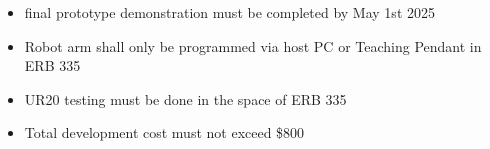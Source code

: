 \begin{itemize}
    \item final prototype demonstration must be completed by May 1st 2025
    \item Robot arm shall only be programmed via host PC or Teaching Pendant in ERB 335
    \item UR20 testing must be done in the space of ERB 335
    \item Total development cost must not exceed \$800
\end{itemize}